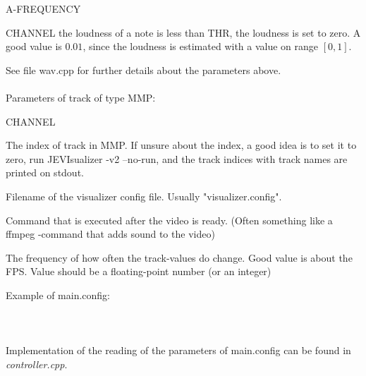 \documentclass{article}
\begin{document}
\begin{labeling}{A-FREQUENCY}
\begin{labeling}{CHANNEL}
                                            the loudness of a note is less than THR, the loudness is set to zero. A good value is $0.01$, since
                                            the loudness is estimated with a value on range $[0,1]$.
                          \end{labeling}
                          See file wav.cpp for further details about the parameters above. \\ \\
                          Parameters of track of type MMP:
                          \begin{labeling}{CHANNEL}
                            \item [TRACK] The index of track in MMP. If unsure about the index, a good idea is to set it to zero, run JEVIsualizer -v2 --no-run, and the track indices with track names are printed on stdout.
                          \end{labeling}
        \item [VISUALIZER]  Filename of the visualizer config file. Usually "visualizer.config".
        \item [ON-END]      Command that is executed after the video is ready. (Often something like a ffmpeg -command that adds sound to the video)
        \item [A-FREQUENCY] The frequency of how often the track-values do change. Good value is about the FPS. Value should be a floating-point
                            number (or an integer)
      \end{labeling}
      
      Example of main.config: \\ \\
       \\ \\
      Implementation of the reading of the parameters of main.config can be found in \textit{controller.cpp}.
      
      
\end{document}
